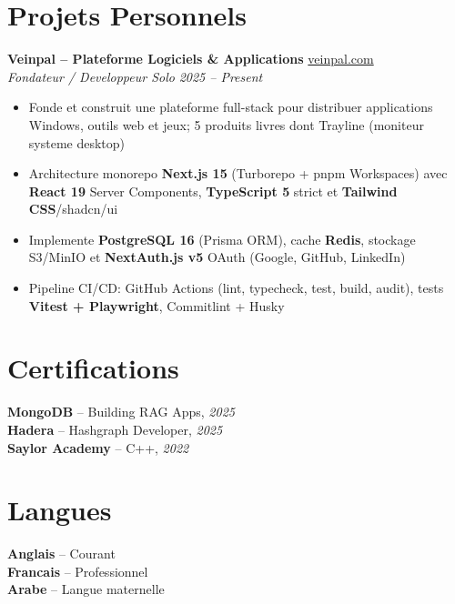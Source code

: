 \documentclass[10pt,a4paper]{article}
\begin{document}
\section*{Projets Personnels}
{\small
\textbf{Veinpal -- Plateforme Logiciels \& Applications} \hfill \href{https://veinpal.com}{veinpal.com}\\[1pt]
\textit{Fondateur / Developpeur Solo} \hfill \textit{2025 -- Present}
\begin{itemize}
  \item Fonde et construit une plateforme full-stack pour distribuer applications Windows, outils web et jeux; 5 produits livres dont Trayline (moniteur systeme desktop)
  \item Architecture monorepo \textbf{Next.js 15} (Turborepo + pnpm Workspaces) avec \textbf{React 19} Server Components, \textbf{TypeScript 5} strict et \textbf{Tailwind CSS}/shadcn/ui
  \item Implemente \textbf{PostgreSQL 16} (Prisma ORM), cache \textbf{Redis}, stockage S3/MinIO et \textbf{NextAuth.js v5} OAuth (Google, GitHub, LinkedIn)
  \item Pipeline CI/CD: GitHub Actions (lint, typecheck, test, build, audit), tests \textbf{Vitest + Playwright}, Commitlint + Husky
\end{itemize}
}

\vspace{4pt}
\section*{Certifications}
{\small
\textbf{MongoDB} -- Building RAG Apps, \textit{2025}\\[1pt]
\textbf{Hadera} -- Hashgraph Developer, \textit{2025}\\[1pt]
\textbf{Saylor Academy} -- C++, \textit{2022}
}

\section*{Langues}
{\small
\textbf{Anglais} -- Courant\\[1pt]
\textbf{Francais} -- Professionnel\\[1pt]
\textbf{Arabe} -- Langue maternelle
}
\end{document}
